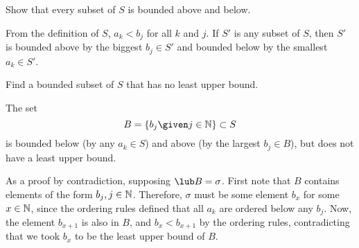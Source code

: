 \begin{problem}
\begin{enumalph}
\begin{answer}
      \end{answer}
    \item Show that every subset of $S$ is bounded above and below.
      \begin{answer}
        From the definition of $S$, $a_k < b_j$ for all $k$ and $j$.
        If $S'$ is any subset of $S$, then $S'$ is bounded above by the biggest $b_j \in S'$
        and bounded below by the smallest $a_k \in S'$.
        
      \end{answer}
    \item Find a bounded subset of $S$ that has no least upper bound.
      \begin{answer}
        The set \[ B = \set{b_j \given j \in \N} \subset S \]
        is bounded below (by any $a_k \in S$) and above (by the largest $b_j \in B$),
        but does not have a least upper bound.

        \step
        As a proof by contradiction, supposing $ \lub B = \sigma$.
        First note that $B$ contains elements of the form $b_j, j \in \mathbb{N}$.
        Therefore, $\sigma$ must be some element $b_x$ for some $x \in \mathbb{N}$, since the ordering
        rules defined that all $a_k$ are ordered below any $b_j$.
        Now, the element $b_{x + 1}$ is also in $B$, and $b_x < b_{x+1}$ by the ordering
        rules, contradicting that we took $b_x$ to be the least upper bound of $B$.        
      \end{answer}
  \end{enumalph}
\end{problem}

